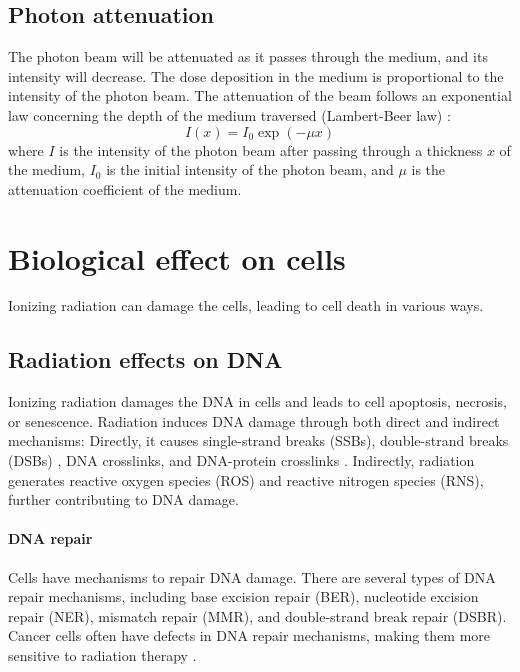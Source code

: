 
\subsection{Photon attenuation}
The photon beam will be attenuated as it passes through the medium, and its intensity will decrease.
The dose deposition in the medium is proportional to the intensity of the photon beam.
The attenuation of the beam follows an exponential law concerning the depth of the medium traversed (Lambert-Beer law) \cite{Beer1852}:
$$I(x) = I_0 \exp(-\mu x)$$
where $I$ is the intensity of the photon beam after passing through a thickness $x$ of the medium,
$I_0$ is the initial intensity of the photon beam,
and $\mu$ is the attenuation coefficient of the medium.


\section{Biological effect on cells}
Ionizing radiation can damage the cells, leading to cell death in various ways.

\subsection{Radiation effects on DNA}
Ionizing radiation damages the DNA \cite{Scholes2014} in cells and leads to cell apoptosis, necrosis, or senescence.
Radiation induces DNA damage through both direct and indirect mechanisms:
Directly, it causes single-strand breaks (SSBs), double-strand breaks (DSBs) \cite{Roots1985}, DNA crosslinks, and DNA-protein crosslinks \cite{Nakano2017}.
Indirectly, radiation generates reactive oxygen species (ROS) and reactive nitrogen species (RNS), further contributing to DNA damage.

\paragraph{DNA repair}
Cells have mechanisms to repair DNA damage.
There are several types of DNA repair mechanisms, including base excision repair (BER), nucleotide excision repair (NER), mismatch repair (MMR), and double-strand break repair (DSBR).
Cancer cells often have defects in DNA repair mechanisms, making them more sensitive to radiation therapy \cite{Brierley2016}.

